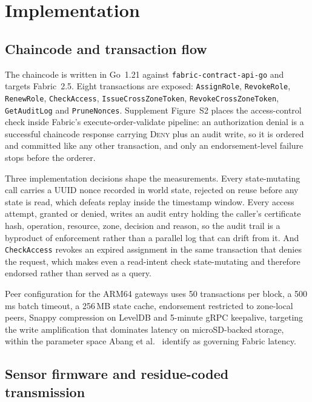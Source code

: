 \documentclass[a4paper,fleqn]{cas-sc}
\begin{document}
\FloatBarrier
\section{Implementation}
\label{sec:impl}

\subsection{Chaincode and transaction flow}
\label{subsec:chaincode}

The chaincode is written in Go~1.21 against \texttt{fabric-contract-api-go}
and targets Fabric~2.5. Eight transactions are exposed: \texttt{AssignRole},
\texttt{RevokeRole}, \texttt{RenewRole}, \texttt{CheckAccess},
\texttt{IssueCrossZoneToken}, \texttt{RevokeCrossZoneToken},
\texttt{GetAuditLog} and \texttt{PruneNonces}. Supplement Figure~S2 places
the access-control check inside Fabric's execute-order-validate pipeline: an
authorization denial is a successful chaincode response carrying
\textsc{Deny} plus an audit write, so it is ordered and committed like any
other transaction, and only an endorsement-level failure stops before the
orderer.

Three implementation decisions shape the measurements. Every state-mutating
call carries a UUID nonce recorded in world state, rejected on reuse before
any state is read, which defeats replay inside the timestamp window. Every
access attempt, granted or denied, writes an audit entry holding the caller's
certificate hash, operation, resource, zone, decision and reason, so the
audit trail is a byproduct of enforcement rather than a parallel log that can
drift from it. And \texttt{CheckAccess} revokes an expired assignment in the
same transaction that denies the request, which makes even a read-intent
check state-mutating and therefore endorsed rather than served as a query.

Peer configuration for the ARM64 gateways uses 50 transactions per block, a
500\,ms batch timeout, a 256\,MB state cache, endorsement restricted to
zone-local peers, Snappy compression on LevelDB and 5-minute gRPC keepalive,
targeting the write amplification that dominates latency on microSD-backed
storage, within the parameter space Abang et al.\ \cite{abang2024latency}
identify as governing Fabric latency.

\subsection{Sensor firmware and residue-coded transmission}
\label{subsec:firmware}
\end{document}
